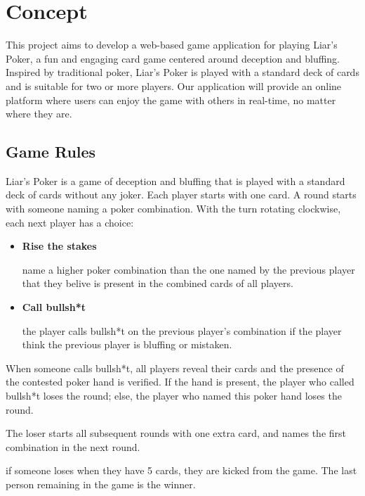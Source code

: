 \documentclass{scrartcl}
\begin{document}


\section{Concept}\label{concept}
This project aims to develop a web-based game application for playing Liar's Poker, a fun and engaging card game centered around deception and bluffing. Inspired by traditional poker, Liar's Poker is played with a standard deck of cards and is suitable for two or more players. Our application will provide an online platform where users can enjoy the game with others in real-time, no matter where they are.

\subsection{Game Rules}\label{game-rules}
Liar's Poker is a game of deception and bluffing that is played with a standard deck of cards without any joker. Each player starts with one card. A round starts with someone naming a poker combination. With the turn rotating clockwise, each next player has a choice:
\begin{itemize}
  \item \textbf{Rise the stakes}\par
  name a higher poker combination than the one named by the previous player that they belive is present in the combined cards of all players.
  \item \textbf{Call bullsh*t} \par
  the player calls bullsh*t on the previous player's combination if the player think the previous player is bluffing or mistaken.
\end{itemize}
When someone calls bullsh*t, all players reveal their cards and the presence of the contested poker hand is verified. If the hand is present, the player who called bullsh*t loses the round; else, the player who named this poker hand loses the round.\par\noindent
The loser starts all subsequent rounds with one extra card, and names the first combination in the next round.\par\noindent
if someone loses when they have 5 cards, they are kicked from the game.
The last person remaining in the game is the winner.
\end{document}
